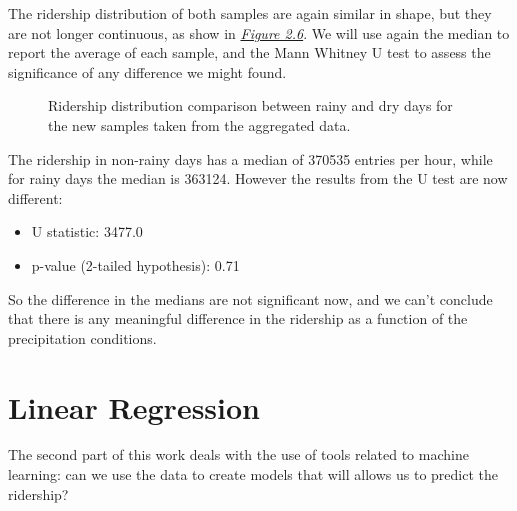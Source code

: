 \documentclass[letterpaper,10pt,english]{sphinxmanual}
\begin{document}
The ridership distribution of both samples are again similar in shape, but they are not
longer continuous, as show in {\hyperref[section1:figure26]{\emph{Figure 2.6}}}. We will use again the median
to report the average of each sample, and the Mann Whitney U test to assess the significance
of any difference we might found.
\begin{figure}[htbp]
\centering
\capstart

\caption{Ridership distribution comparison between rainy and dry days for the new samples
taken from the aggregated data.}\label{section1:figure26}\end{figure}

The ridership in non-rainy days has a median of 370535 entries per hour, while for rainy
days the median is 363124. However the results from the U test are now different:
\begin{itemize}
\item {} 
U statistic: 3477.0

\item {} 
p-value (2-tailed hypothesis): 0.71

\end{itemize}

So the difference in the medians are not significant now, and we can't conclude that
there is any meaningful difference in the ridership as a function of the precipitation
conditions.


\chapter{Linear Regression}
\label{section2:linear-regression}\label{section2::doc}
The second part of this work deals with the use of tools related to machine
learning: can we use the data to create models that will allows us to predict
the ridership?
\end{document}
